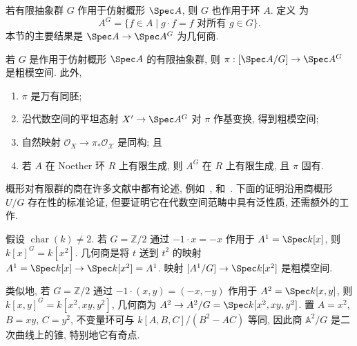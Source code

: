 若有限抽象群 $G$ 作用于仿射概形 $\Spec A$, 则 $G$ 也作用于环 $A$. 定义 为
\[
A^G=\{f\in A\mid g\cdot f=f\text{ 对所有 }g\in G\}.
\]
本节的主要结果是 $\Spec A\to\Spec A^G$ 为几何商.
\begin{theorem}\label{src:5.2.3}
若 $G$ 是作用于仿射概形 $\Spec A$ 的有限抽象群, 则 $\pi:[\Spec A/G]\to\Spec A^G$ 是粗模空间. 此外,
\begin{enumerate}[(1)]
\item $\pi$ 是万有同胚;
\item 沿代数空间的平坦态射 $X'\to\Spec A^G$ 对 $\pi$ 作基变换, 得到粗模空间;
\item 自然映射 $\mathcal O_X\to\pi_*\mathcal O_{\mathcal X}$ 是同构; 且
\item 若 $A$ 在 Noether 环 $R$ 上有限生成, 则 $A^G$ 在 $R$ 上有限生成, 且 $\pi$ 固有.
\end{enumerate}
\end{theorem}
概形对有限群的商在许多文献中都有论述, 例如~\cite[\S V.9]{Bou89}, \cite[\S III.12]{Ser88} 和~\cite[第 $66$ 页]{Mum70a}. 下面的证明沿用商概形 $U/G$ 存在性的标准论证, 但要证明它在代数空间范畴中具有泛性质, 还需额外的工作.
\newpage
\begin{example}\label{src:5.2.4}
假设 $\operatorname{char}(k)\neq2$. 若 $G=\mathbb Z/2$ 通过 $-1\cdot x=-x$ 作用于 $\mathbb A^1=\Spec k[x]$, 则 $k[x]^G=k[x^2]$. 几何商是将 $t$ 送到 $t^2$ 的映射 $\mathbb A^1=\Spec k[x]\to\Spec k[x^2]=\mathbb A^1$. 映射 $[\mathbb A^1/G]\to\Spec k[x^2]$ 是粗模空间.

类似地, 若 $G=\mathbb Z/2$ 通过 $-1\cdot(x,y)=(-x,-y)$ 作用于 $\mathbb A^2=\Spec k[x,y]$, 则 $k[x,y]^G=k[x^2,xy,y^2]$, 几何商为 $\mathbb A^2\to\mathbb A^2/G=\Spec k[x^2,xy,y^2]$. 置 $A=x^2$, $B=xy$, $C=y^2$, 不变量环可与 $k[A,B,C]/(B^2-AC)$ 等同, 因此商 $\mathbb A^2/G$ 是二次曲线上的锥, 特别地它有奇点.
\begin{figure}[H]
\centering{}\label{src:5.2.5}

\end{figure}
\end{example}

